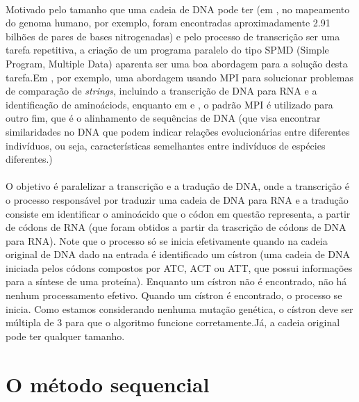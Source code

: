 \documentclass[a4paper,10pt]{article}
\begin{document}
\paragraph{}Motivado pelo tamanho que uma cadeia de DNA pode ter (em \citet{venter2001sequence}, no mapeamento do genoma humano, por exemplo, foram encontradas aproximadamente 2.91 bilhões de pares de bases nitrogenadas) e pelo processo de transcrição ser uma tarefa repetitiva, a criação de um programa paralelo do tipo SPMD (Simple Program, Multiple Data) aparenta ser uma boa abordagem para a solução desta tarefa.Em  \citet{chibli2008multiprocessor}, por exemplo, uma abordagem usando MPI para solucionar problemas de comparação de \emph{strings}, incluindo a transcrição de DNA para RNA e a identificação de aminoáciods, enquanto em \citet{kleinjung2002parallelized} e \citet{xue2014parallel}, o padrão MPI é utilizado para outro fim, que é o alinhamento de sequências de DNA (que visa encontrar similaridades no DNA que podem indicar relações evolucionárias entre diferentes indivíduos, ou seja, características semelhantes entre indivíduos de espécies diferentes.)\\ 
\paragraph{}O objetivo é paralelizar a transcrição e a tradução de DNA, onde a transcrição é o processo responsável por traduzir uma cadeia de DNA para RNA e a tradução consiste em identificar o aminoácido que o códon em questão representa, a partir de códons de RNA (que foram obtidos a partir da trascrição de códons de DNA para RNA). Note que o processo só se inicia efetivamente quando na cadeia original de DNA dado na entrada é identificado um cístron (uma cadeia de DNA iniciada pelos códons compostos por ATC, ACT ou ATT, que possui informações para a síntese de uma proteína). Enquanto um cístron não é encontrado, não há nenhum processamento efetivo. Quando um cístron é encontrado, o processo se inicia. Como estamos considerando nenhuma mutação genética, o cístron deve ser múltipla de 3 para que o algoritmo funcione corretamente.Já, a cadeia original pode ter qualquer tamanho.\\
\newpage

\section{O método sequencial}
\end{document}
